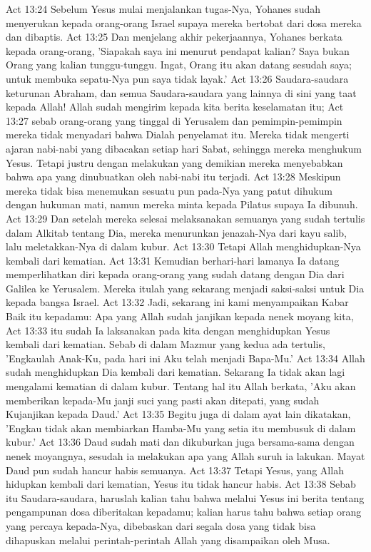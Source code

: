 Act 13:24  Sebelum Yesus mulai menjalankan tugas-Nya, Yohanes sudah menyerukan kepada orang-orang Israel supaya mereka bertobat dari dosa mereka dan dibaptis.
Act 13:25  Dan menjelang akhir pekerjaannya, Yohanes berkata kepada orang-orang, 'Siapakah saya ini menurut pendapat kalian? Saya bukan Orang yang kalian tunggu-tunggu. Ingat, Orang itu akan datang sesudah saya; untuk membuka sepatu-Nya pun saya tidak layak.'
Act 13:26  Saudara-saudara keturunan Abraham, dan semua Saudara-saudara yang lainnya di sini yang taat kepada Allah! Allah sudah mengirim kepada kita berita keselamatan itu;
Act 13:27  sebab orang-orang yang tinggal di Yerusalem dan pemimpin-pemimpin mereka tidak menyadari bahwa Dialah penyelamat itu. Mereka tidak mengerti ajaran nabi-nabi yang dibacakan setiap hari Sabat, sehingga mereka menghukum Yesus. Tetapi justru dengan melakukan yang demikian mereka menyebabkan bahwa apa yang dinubuatkan oleh nabi-nabi itu terjadi.
Act 13:28  Meskipun mereka tidak bisa menemukan sesuatu pun pada-Nya yang patut dihukum dengan hukuman mati, namun mereka minta kepada Pilatus supaya Ia dibunuh.
Act 13:29  Dan setelah mereka selesai melaksanakan semuanya yang sudah tertulis dalam Alkitab tentang Dia, mereka menurunkan jenazah-Nya dari kayu salib, lalu meletakkan-Nya di dalam kubur.
Act 13:30  Tetapi Allah menghidupkan-Nya kembali dari kematian.
Act 13:31  Kemudian berhari-hari lamanya Ia datang memperlihatkan diri kepada orang-orang yang sudah datang dengan Dia dari Galilea ke Yerusalem. Mereka itulah yang sekarang menjadi saksi-saksi untuk Dia kepada bangsa Israel.
Act 13:32  Jadi, sekarang ini kami menyampaikan Kabar Baik itu kepadamu: Apa yang Allah sudah janjikan kepada nenek moyang kita,
Act 13:33  itu sudah Ia laksanakan pada kita dengan menghidupkan Yesus kembali dari kematian. Sebab di dalam Mazmur yang kedua ada tertulis, 'Engkaulah Anak-Ku, pada hari ini Aku telah menjadi Bapa-Mu.'
Act 13:34  Allah sudah menghidupkan Dia kembali dari kematian. Sekarang Ia tidak akan lagi mengalami kematian di dalam kubur. Tentang hal itu Allah berkata, 'Aku akan memberikan kepada-Mu janji suci yang pasti akan ditepati, yang sudah Kujanjikan kepada Daud.'
Act 13:35  Begitu juga di dalam ayat lain dikatakan, 'Engkau tidak akan membiarkan Hamba-Mu yang setia itu membusuk di dalam kubur.'
Act 13:36  Daud sudah mati dan dikuburkan juga bersama-sama dengan nenek moyangnya, sesudah ia melakukan apa yang Allah suruh ia lakukan. Mayat Daud pun sudah hancur habis semuanya.
Act 13:37  Tetapi Yesus, yang Allah hidupkan kembali dari kematian, Yesus itu tidak hancur habis.
Act 13:38  Sebab itu Saudara-saudara, haruslah kalian tahu bahwa melalui Yesus ini berita tentang pengampunan dosa diberitakan kepadamu; kalian harus tahu bahwa setiap orang yang percaya kepada-Nya, dibebaskan dari segala dosa yang tidak bisa dihapuskan melalui perintah-perintah Allah yang disampaikan oleh Musa.
